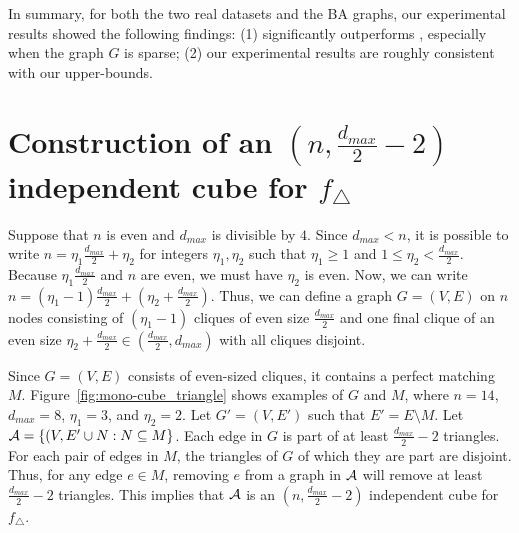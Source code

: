 In summary, for both the two real datasets and the BA graphs, our experimental results showed the following findings: 
(1)  significantly outperforms , especially when the graph $G$ is sparse; 
(2) our experimental results are roughly consistent with our upper-bounds.

\section{Construction of an $(n, \frac{d_{max}}{2}-2)$ independent cube for $f_\triangle$}
\label{sub:cube_triangle}
Suppose that $n$ is even and $d_{max}$ is divisible by $4$.
Since $d_{max} < n$, it is possible to write 
$n = \eta_1 \frac{d_{max}}{2} + \eta_2$ 
for integers 
$\eta_1, \eta_2$
such that 
$\eta_1 \geq 1$ and $1 \leq \eta_2 < \frac{d_{max}}{2}$. 
Because 
$\eta_1 \frac{d_{max}}{2}$ 
and $n$ are even, 
we must have 
$\eta_2$ 
is even.
Now, we can write 
$n = (\eta_1-1) \frac{d_{max}}{2} + (\eta_2 + \frac{d_{max}}{2})$.
Thus, 
we can define 
a graph $G=(V,E)$ on $n$ 
nodes 
consisting of 
$(\eta_1-1)$ 
cliques of 
even 
size
$\frac{d_{max}}{2}$ and one final clique of an even size $\eta_2+\frac{d_{max}}{2} \in (\frac{d_{max}}{2}, d_{max})$ 
with all cliques disjoint. 

Since $G=(V,E)$ consists of even-sized cliques, it contains a perfect matching $M$. 
Figure~\ref{fig:mono-cube_triangle} shows examples of $G$ and $M$, where $n=14$, $d_{max} = 8$, $\eta_1 = 3$, and $\eta_2 = 2$. 
Let 
$G'=(V,E')$ such that $E' = E \setminus M$. 
Let $\mathcal{A} = \{(V,E' \cup N: N \subseteq M\}$. 
Each edge in $G$ is part of at least $\frac{d_{max}}{2}-2$ triangles. 
For each pair of edges in $M$, the triangles of $G$ of which they are part
are disjoint. 
Thus, 
for any edge $e \in M$, 
removing $e$ 
from 
a graph in $\mathcal{A}$ 
will remove at least $\frac{d_{max}}{2}-2$ triangles. This implies 
that $\mathcal{A}$ 
is an $(n,\frac{d_{max}}{2}-2)$ independent cube for $f_\triangle$.

